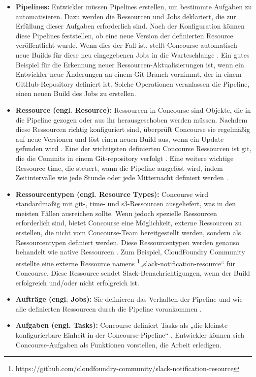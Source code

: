 \begin{itemize}
	
	\item \textbf{Pipelines:} Entwickler müssen Pipelines erstellen, um bestimmte Aufgaben zu automatisieren. Dazu werden die Ressourcen und Jobs deklariert, die zur Erfüllung dieser Aufgaben erforderlich sind. Nach der Konfiguration können diese Pipelines feststellen, ob eine neue Version der definierten Resource veröffentlicht wurde. Wenn dies der Fall ist, stellt Concourse automatisch neue Builds für diese neu eingegebenen Jobs in die Warteschlange \cite{ConcourseCI:pipelines}. Ein gutes Beispiel für die Erkennung neuer Ressourcen-Aktualisierungen ist, wenn ein Entwickler neue Änderungen an einem Git Branch vornimmt, der in einem GitHub-Repository definiert ist. Solche Operationen veranlassen die Pipeline, einen neuen Build des Jobs zu erstellen.
	
	\item \textbf{Ressource (engl. Resource):} Ressourcen in Concourse sind Objekte, die in die Pipeline gezogen oder aus ihr herausgeschoben werden müssen. Nachdem diese Ressourcen richtig konfiguriert sind, überprüft Concourse sie regelmäßig auf neue Versionen und löst einen neuen Build aus, wenn ein Update gefunden wird \cite{ConcourseCI:Resources}. Eine der wichtigsten definierten Concourse Ressourcen ist git, die die Commits in einem Git-repository verfolgt \cite{ConcourseCI:git}. Eine weitere wichtige Ressource time, die steuert, wann die Pipeline ausgelöst wird, indem Zeitintervalle wie jede Stunde oder jede Mitternacht definiert werden \cite{ConcourseCI:time}.
	
	\item \textbf{Ressourcentypen (engl. Resource Types):} Concourse wird standardmäßig mit git-, time- und s3-Ressourcen ausgeliefert, was in den meisten Fällen ausreichen sollte. Wenn jedoch spezielle Ressourcen erforderlich sind, bietet Concourse eine Möglichkeit, externe Ressourcen zu erstellen, die nicht vom Concourse-Team bereitgestellt werden, sondern als Ressourcentypen definiert werden. Diese Ressourcentypen werden genauso behandelt wie native Ressourcen \cite{ConcourseCI:resourcetypes}. Zum Beispiel, CloudFoundry Community erstellte eine externe Ressource namens \footnote{https://github.com/cloudfoundry-community/slack-notification-resource}„slack-notification-resource“ für Concourse. Diese Ressource sendet Slack-Benachrichtigungen, wenn der Build erfolgreich und/oder nicht erfolgreich ist.
	
	\item \textbf{Aufträge (engl. Jobs):} Sie definieren das Verhalten der Pipeline und wie alle definierten Ressourcen durch die Pipeline vorankommen \cite{ConcourseCI:jobs}.
	
	\item \textbf{Aufgaben (engl. Tasks):} Concourse definiert Tasks als „die kleinste konfigurierbare Einheit in der Concourse-Pipeline“ \cite{ConcourseCI:tasks}. Entwickler können sich Concourse-Aufgaben als Funktionen vorstellen, die Arbeit erledigen.
	
\end{itemize}
